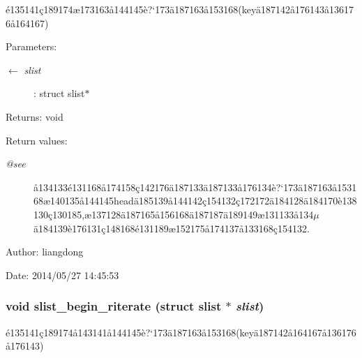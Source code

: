 \'{e}135141\c{c}189174\ae{}173163\aa{}144145\`{e}?`173\"{a}187163\aa{}153168(key\"{a}187142\aa{}176143\aa{}136176\aa{}164167) 

\begin{Desc}
\item[Parameters:]
\begin{description}
\item[\mbox{$\leftarrow$} {\em slist}]: struct slist$\ast$ \end{description}
\end{Desc}
\begin{Desc}
\item[Returns:]void \end{Desc}
\begin{Desc}
\item[Return values:]
\begin{description}
\item[{\em @see}]\aa{}134133\'{e}131168\aa{}174158\c{c}142176\"{a}187133\"{a}187133\aa{}176134\`{e}?`173\"{a}187163\aa{}153168\ae{}140135\aa{}144145head\"{a}185139\aa{}144142\c{c}154132\c{c}172172\"{a}184128\"{a}184170\`{e}138130\c{c}130185,\ae{}137128\"{a}187165\aa{}156168\"{a}187187\"{a}189149\ae{}131133\aa{}134$\mu$\"{a}184139\`{e}176131\c{c}148168\'{e}131189\ae{}152175\aa{}174137\aa{}133168\c{c}154132. \end{description}
\end{Desc}
\begin{Desc}
\item[Author:]liangdong \end{Desc}
\begin{Desc}
\item[Date:]2014/05/27 14:45:53 \end{Desc}
\subsubsection{\setlength{\rightskip}{0pt plus 5cm}void slist\_\-begin\_\-riterate (struct slist $\ast$ {\em slist})}\label{slist_8h_a13}


\'{e}135141\c{c}189174\aa{}143141\aa{}144145\`{e}?`173\"{a}187163\aa{}153168(key\"{a}187142\aa{}164167\aa{}136176\aa{}176143) 

